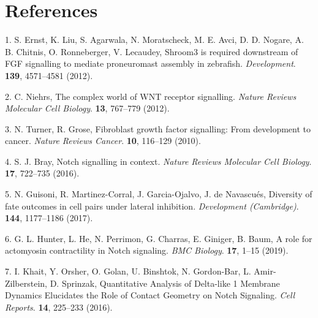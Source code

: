 \documentclass[11pt,singlespacinge,twoside]{reedthesis} %
\theoremstyle{definition}
\theoremstyle{definition}
\theoremstyle{definition}
\theoremstyle{remark}
\begin{document}
\vskip 2cm
\centerline{\makebox[6cm][c]{\hrulefill} \makebox[0.5cm][c]{} \makebox[6cm][c]{\hrulefill}}
\centerline{\makebox[0.5cm][c]{} }

\backmatter

\hypertarget{references}{%
\chapter*{References}\label{references}}


\noindent

\setlength{\parindent}{-0.20in}
\setlength{\leftskip}{0.20in}
\setlength{\parskip}{8pt}

\hypertarget{refs}{}
\leavevmode\hypertarget{ref-Ernst2012a}{}%
1. S. Ernst, K. Liu, S. Agarwala, N. Moratscheck, M. E. Avci, D. D. Nogare, A. B. Chitnis, O. Ronneberger, V. Lecaudey, Shroom3 is required downstream of FGF signalling to mediate proneuromast assembly in zebrafish. \emph{Development}. \textbf{139}, 4571--4581 (2012).

\leavevmode\hypertarget{ref-Niehrs2012}{}%
2. C. Niehrs, The complex world of WNT receptor signalling. \emph{Nature Reviews Molecular Cell Biology}. \textbf{13}, 767--779 (2012).

\leavevmode\hypertarget{ref-Turner2010}{}%
3. N. Turner, R. Grose, Fibroblast growth factor signalling: From development to cancer. \emph{Nature Reviews Cancer}. \textbf{10}, 116--129 (2010).

\leavevmode\hypertarget{ref-Bray2016}{}%
4. S. J. Bray, Notch signalling in context. \emph{Nature Reviews Molecular Cell Biology}. \textbf{17}, 722--735 (2016).

\leavevmode\hypertarget{ref-Guisoni2017}{}%
5. N. Guisoni, R. Martinez-Corral, J. Garcia-Ojalvo, J. de Navascués, Diversity of fate outcomes in cell pairs under lateral inhibition. \emph{Development (Cambridge)}. \textbf{144}, 1177--1186 (2017).

\leavevmode\hypertarget{ref-Hunter2019}{}%
6. G. L. Hunter, L. He, N. Perrimon, G. Charras, E. Giniger, B. Baum, A role for actomyosin contractility in Notch signaling. \emph{BMC Biology}. \textbf{17}, 1--15 (2019).

\leavevmode\hypertarget{ref-Khait2016}{}%
7. I. Khait, Y. Orsher, O. Golan, U. Binshtok, N. Gordon-Bar, L. Amir-Zilberstein, D. Sprinzak, Quantitative Analysis of Delta-like 1 Membrane Dynamics Elucidates the Role of Contact Geometry on Notch Signaling. \emph{Cell Reports}. \textbf{14}, 225--233 (2016).
\end{document}
